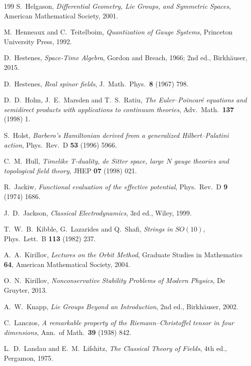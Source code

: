\begin{thebibliography}{199}
 S.~Helgason, \emph{Differential Geometry, Lie Groups, and Symmetric Spaces}, American Mathematical Society, 2001.

 M.~Henneaux and C.~Teitelboim, \emph{Quantization of Gauge Systems}, Princeton University Press, 1992.

 D.~Hestenes, \emph{Space-Time Algebra}, Gordon and Breach, 1966; 2nd ed., Birkh\"auser, 2015.

 D.~Hestenes, \emph{Real spinor fields}, J.~Math.~Phys.~\textbf{8} (1967) 798.

 D.~D.~Holm, J.~E.~Marsden and T.~S.~Ratiu, \emph{The Euler--Poincar\'e equations and semidirect products with applications to continuum
theories}, Adv.~Math.~\textbf{137} (1998) 1.

 S.~Holst, \emph{Barbero's Hamiltonian derived from a generalized Hilbert--Palatini action}, Phys.~Rev.~D \textbf{53} (1996) 5966.

 C.~M.~Hull, \emph{Timelike T-duality, de Sitter space, large $N$ gauge theories and topological field theory}, JHEP \textbf{07} (1998) 021.

 R.~Jackiw, \emph{Functional evaluation of the effective potential}, Phys.~Rev.~D \textbf{9} (1974) 1686.

 J.~D.~Jackson, \emph{Classical Electrodynamics}, 3rd ed., Wiley, 1999.

 T.~W.~B.~Kibble, G.~Lazarides and Q.~Shafi, \emph{Strings in $SO(10)$}, Phys.~Lett.~B \textbf{113} (1982) 237.

 A.~A.~Kirillov, \emph{Lectures on the Orbit Method}, Graduate Studies in Mathematics \textbf{64}, American Mathematical Society, 2004.

 O.~N.~Kirillov, \emph{Nonconservative Stability Problems of Modern Physics}, De Gruyter, 2013.

 A.~W.~Knapp, \emph{Lie Groups Beyond an Introduction}, 2nd ed., Birkh\"auser, 2002.

 C.~Lanczos, \emph{A remarkable property of the Riemann--Christoffel tensor in four dimensions}, Ann.~of Math.~\textbf{39} (1938) 842.

 L.~D.~Landau and E.~M.~Lifshitz, \emph{The Classical Theory of Fields}, 4th ed., Pergamon, 1975.


\end{thebibliography}

